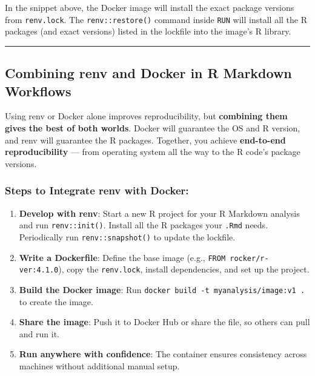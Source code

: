 \documentclass[
  11pt,
]{article}
\providecommand{\tightlist}{%
  \setlength{\itemsep}{0pt}\setlength{\parskip}{0pt}}
\begin{document}
In the snippet above, the Docker image will install the exact package
versions from \texttt{renv.lock}. The \texttt{renv::restore()} command
inside \texttt{RUN} will install all the R packages (and exact versions)
listed in the lockfile into the image's R library.

\begin{center}\rule{0.5\linewidth}{0.5pt}\end{center}

\subsection{Combining renv and Docker in R Markdown
Workflows}\label{combining-renv-and-docker-in-r-markdown-workflows}

Using renv or Docker alone improves reproducibility, but
\textbf{combining them gives the best of both worlds}. Docker will
guarantee the OS and R version, and renv will guarantee the R packages.
Together, you achieve \textbf{end-to-end reproducibility} --- from
operating system all the way to the R code's package versions.

\subsubsection{Steps to Integrate renv with
Docker:}\label{steps-to-integrate-renv-with-docker}

\begin{enumerate}
\def\labelenumi{\arabic{enumi}.}
\tightlist
\item
  \textbf{Develop with renv}: Start a new R project for your R Markdown
  analysis and run \texttt{renv::init()}. Install all the R packages
  your \texttt{.Rmd} needs. Periodically run \texttt{renv::snapshot()}
  to update the lockfile.
\item
  \textbf{Write a Dockerfile}: Define the base image (e.g.,
  \texttt{FROM\ rocker/r-ver:4.1.0}), copy the \texttt{renv.lock},
  install dependencies, and set up the project.
\item
  \textbf{Build the Docker image}: Run
  \texttt{docker\ build\ -t\ myanalysis/image:v1\ .} to create the
  image.
\item
  \textbf{Share the image}: Push it to Docker Hub or share the file, so
  others can pull and run it.
\item
  \textbf{Run anywhere with confidence}: The container ensures
  consistency across machines without additional manual setup.
\end{enumerate}
\end{document}
